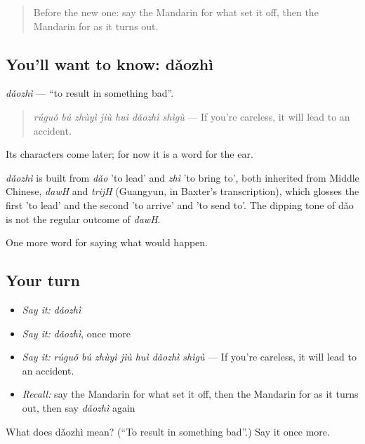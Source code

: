 \label{lesson:ZH-C537-daozhi}



\begin{quote}
Before the new one: say the Mandarin for what set it off, then the Mandarin for as it turns out.
\end{quote}

\subsection*{You'll want to know: dǎozhì}
\emph{dǎozhì} — \textquotedblleft{}to result in something bad\textquotedblright{}.

\begin{quote}
\emph{rúguǒ bú zhùyì jiù huì dǎozhì shìgù} — If you're careless, it will lead to an accident.
\end{quote}

Its characters come later; for now it is a word for the ear.

\begin{cousinweb}
\emph{dǎozhì} is built from \emph{dǎo} 'to lead' and \emph{zhì} 'to bring to', both inherited from Middle Chinese, \emph{dawH} and \emph{trijH} (Guangyun, in Baxter's transcription), which glosses the first 'to lead' and the second 'to arrive' and 'to send to'. The dipping tone of dǎo is not the regular outcome of \emph{dawH}.
\end{cousinweb}

\begin{grammarlens}[title={What you've built}]
One more word for saying what would happen.
\end{grammarlens}

\subsection*{Your turn}
\begin{itemize}
\raggedright
  \item \emph{Say it:} \emph{dǎozhì}
  \item \emph{Say it:} \emph{dǎozhì}, once more
  \item \emph{Say it:} \emph{rúguǒ bú zhùyì jiù huì dǎozhì shìgù} — If you're careless, it will lead to an accident.
  \item \emph{Recall:} say the Mandarin for what set it off, then the Mandarin for as it turns out, then say \emph{dǎozhì} again
\end{itemize}

\begin{tcolorbox}[breakable,colback=teal!4,colframe=teal!35!black,title={Before you move on}]
What does dǎozhì mean? (\textquotedblleft{}To result in something bad\textquotedblright{}.) Say it once more.
\end{tcolorbox}
